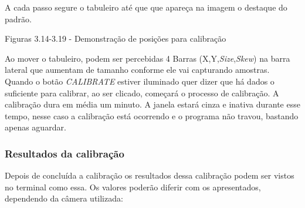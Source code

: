A cada passo segure o tabuleiro até que que apareça na imagem o destaque do padrão.

Figuras 3.14-3.19 - Demonstração de posições para calibração

Ao mover o tabuleiro, podem ser percebidas 4 Barras (X,Y,\textit{Size},\textit{Skew}) na barra lateral que aumentam de tamanho conforme ele vai capturando amostras. Quando o botão \textit{CALIBRATE} estiver iluminado quer dizer que há dados o suficiente para calibrar, ao ser clicado, começará o processo de calibração.
A calibração dura em média um minuto. A janela estará cinza e inativa durante esse tempo, nesse caso a calibração está ocorrendo e o programa não travou, bastando apenas aguardar.

\subsubsection{Resultados da calibração}

Depois de concluída a calibração os resultados dessa calibração podem ser vistos no terminal como essa. Os valores poderão diferir com os apresentados, dependendo da câmera utilizada:


